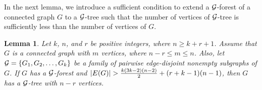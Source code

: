 \documentclass[11pt]{article}
\newtheorem{prelem}{{\bf Lemma}}
\newenvironment{lem}{\begin{prelem}{\hspace{-0.5
               em}{\bf.\ }}}{\end{prelem}}
\begin{document}
In the next lemma, we introduce a sufficient condition to extend a  ${\cal G}$-forest of a connected graph $G$ to a ${\cal G}$-tree such that the number of vertices of  ${\cal G}$-tree is sufficiently 
less than the number of vertices of $G$. 
\begin{lem}\label{treesubgraph}
Let $k$, $n$, and $r$ be positive integers, where $n\geq k+r+1$.
Assume that $G$ is a connected graph with $m$ vertices, where $n-r\leq m\leq n$. 
Also, let ${\cal G}=\{G_1,G_2,\ldots,G_k\}$ be a family of 
pairwise  edge-disjoint 
nonempty subgraphs of $G$. If $G$ has  a  ${\cal G}$-forest and $|E(G)|> {k(3k-2)(n-2)\over 2}+ (r+k-1)(n-1)$, then $G$ has a  ${\cal G}$-tree with $n-r$ vertices. 
\end{lem}
\end{document}
